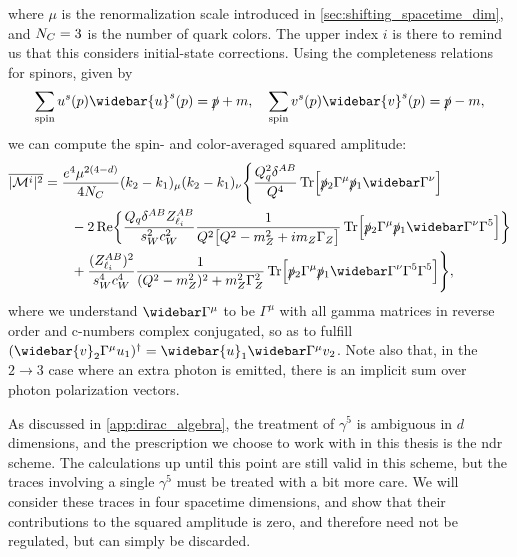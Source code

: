 where $\mu$ is the renormalization scale introduced in \cref{sec:shifting_spacetime_dim}, and $N_C=3$ is the number of quark colors.
The upper index $i$ is there to remind us that this considers initial-state corrections.
Using the completeness relations for spinors, given by~\cite{Peskin:1995ev}
\begin{equation}
    \sum_{\text{spin}} u^s(p)\widebar{u}^s(p) = \pslash + m, \quad
    \sum_{\text{spin}} v^s(p)\widebar{v}^s(p) = \pslash - m,
\end{equation}
we can compute the spin- and color-averaged squared amplitude:
\begin{equation}
\begin{split}
    \overline{|\M^i|^2}
    &= \frac{e^4\mu^{2(4-d)}}{4\NC} (k_2-k_1)_\mu (k_2-k_1)_\nu \Biggl\{
        \frac{Q_q^2\delta^{AB}}{Q^4}\Tr\Bigl[\ptwoslash\Gamma^\mu \poneslash\widebar\Gamma^\nu \Bigr]
        \\ &\qquad
        - 2\Re\biggl\{ \frac{Q_q\delta^{AB}\zliab}{\sw^2\cw^2}\frac{1}{Q^2\bigl[ Q^2-m_Z^2+im_Z\Gamma_Z \bigr]} \Tr\Bigl[ \ptwoslash\Gamma^\mu\poneslash\widebar\Gamma^\nu\Gamma^5 \Bigr] \biggr\}
        \\ &\qquad
        + \frac{(\zliab)^2}{\sw^4\cw^4}\frac{1}{(Q^2-m_Z^2)^2+m_Z^2\Gamma_Z^2}\Tr\Bigl[ \ptwoslash\Gamma^\mu\poneslash\widebar\Gamma^\nu \Gamma^5\Gamma^5 \Bigr]
    \Biggr\}, \label{eq:Mi_squared_pre_trace}
\end{split}
\end{equation}
where we understand $\widebar\Gamma^\mu$ to be $\Gamma^\mu$ with all gamma matrices in reverse order and c-numbers complex conjugated, so as to fulfill $(\widebar{v}_2\Gamma^\mu u_1)^\dagger = \widebar{u}_1 \widebar\Gamma^\mu v_2$. Note also that, in the $2\to3$ case where an extra photon is emitted, there is an implicit sum over photon polarization vectors.

As discussed in \cref{app:dirac_algebra}, the treatment of $\gamma^5$ is ambiguous in $d$ dimensions, and the prescription we choose to work with in this thesis is the \gls{ndr} scheme. The calculations up until this point are still valid in this scheme, but the traces involving a single $\gamma^5$ must be treated with a bit more care. We will consider these traces in four spacetime dimensions, and show that their contributions to the squared amplitude is zero, and therefore need not be regulated, but can simply be discarded.

